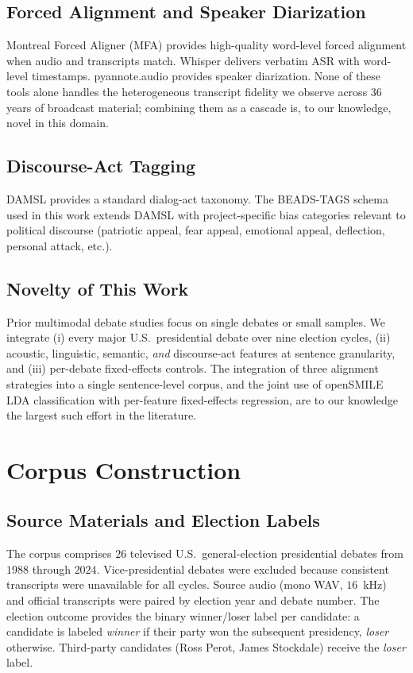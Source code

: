 \documentclass[journal]{IEEEtran}
\begin{document}
\subsection{Forced Alignment and Speaker Diarization}
Montreal Forced Aligner (MFA) \cite{mcauliffe2017mfa} provides
high-quality word-level forced alignment when audio and transcripts
match. Whisper \cite{radford2023whisper} delivers verbatim ASR with
word-level timestamps. pyannote.audio \cite{bredin2023pyannote}
provides speaker diarization. None of these tools alone handles the
heterogeneous transcript fidelity we observe across $36$ years of
broadcast material; combining them as a cascade is, to our knowledge,
novel in this domain.

\subsection{Discourse-Act Tagging}
DAMSL \cite{core1997damsl} provides a standard dialog-act taxonomy.
The BEADS-TAGS schema used in this work extends DAMSL with
project-specific bias categories relevant to political discourse
(patriotic appeal, fear appeal, emotional appeal, deflection,
personal attack, etc.).

\subsection{Novelty of This Work}
Prior multimodal debate studies focus on single debates or small samples.
We integrate (i) every major U.S.\ presidential debate over nine
election cycles, (ii) acoustic, linguistic, semantic, \emph{and}
discourse-act features at sentence granularity, and (iii) per-debate
fixed-effects controls. The integration of three alignment strategies
into a single sentence-level corpus, and the joint use of openSMILE
LDA classification with per-feature fixed-effects regression, are to
our knowledge the largest such effort in the literature.

\section{Corpus Construction}
\label{sec:corpus}

\subsection{Source Materials and Election Labels}
The corpus comprises $26$ televised U.S.\ general-election presidential
debates from $1988$ through $2024$. Vice-presidential debates were
excluded because consistent transcripts were unavailable for all
cycles. Source audio (mono WAV, $16$~kHz) and official transcripts
were paired by election year and debate number. The election outcome
provides the binary winner/loser label per candidate: a candidate is
labeled \emph{winner} if their party won the subsequent presidency,
\emph{loser} otherwise. Third-party candidates (Ross Perot, James
Stockdale) receive the \emph{loser} label.
\end{document}

